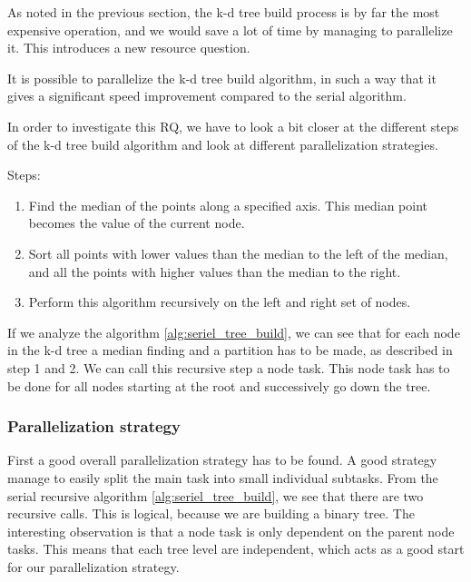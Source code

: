 




As noted in the previous section, the k-d tree build process is by far the most expensive operation, and we would save a lot of time by managing to parallelize it. This introduces a new resource question.

\begin{myrq}
\label{rq:parallel_build}
    It is possible to parallelize the k-d tree build algorithm, in such a way that it gives a significant speed improvement compared to the serial algorithm.
\end{myrq}

In order to investigate this RQ, we have to look a bit closer at the different steps of the k-d tree build algorithm and look at different parallelization strategies.

Steps:
\begin{enumerate}
    \item Find the median of the points along a specified axis. This median point becomes the value of the current node.
    \item Sort all points with lower values than the median to the left of the median, and all the points with higher values than the median to the right.
    \item Perform this algorithm recursively on the left and right set of nodes.
\end{enumerate}

If we analyze the algorithm \ref{alg:seriel_tree_build}, we can see that for each node in the k-d tree a median finding and a partition has to be made, as described in step 1 and 2. We can call this recursive step a node task. This node task has to be done for all nodes starting at the root and successively go down the tree.


\subsubsection{Parallelization strategy} %
\label{ssub:parallelization_strategy}


First a good overall parallelization strategy has to be found. A good strategy manage to easily split the main task into small individual subtasks. From the serial recursive algorithm \ref{alg:seriel_tree_build}, we see that there are two recursive calls. This is logical, because we are building a binary tree.  The interesting observation is that a node task is only dependent on the parent node tasks. This means that each tree level are independent, which acts as a good start for our parallelization strategy.

